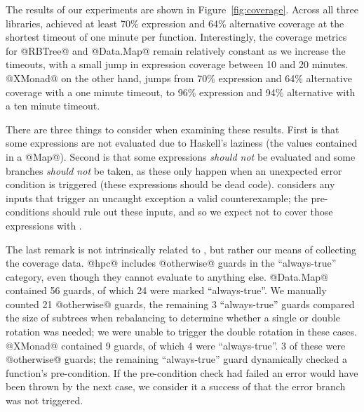 %
The results of our experiments are shown in Figure~\ref{fig:coverage}. 
Across all three libraries, \toolname achieved at least 70\% expression 
and 64\% alternative coverage at the shortest timeout of one minute per function. 
Interestingly, the coverage metrics for @RBTree@ and @Data.Map@ remain relatively constant as we increase
the timeouts, with a small jump in expression coverage between 10 and 20 minutes.
@XMonad@ on the other hand, jumps from 70\% expression and 64\% alternative
coverage with a one minute timeout, to 96\% expression and 94\% alternative
with a ten minute timeout.


There are three things to consider when examining these results. 
%
First is that some expressions are not evaluated due to Haskell's 
laziness (\eg the values contained in a @Map@). 
%
Second is that some expressions \emph{should not} be evaluated 
and some branches \emph{should not} be taken, as these only happen
when an unexpected error condition is triggered (\ie these expressions
should be dead code).
%
\toolname considers any inputs that trigger an uncaught exception a 
valid counterexample; the pre-conditions should rule out these inputs, 
and so we expect not to cover those expressions with \toolname.

The last remark is not intrinsically related to \toolname, 
but rather our means of collecting the coverage data. @hpc@ includes 
@otherwise@ guards in the ``always-true'' category, even though they 
cannot evaluate to anything else. 
%
@Data.Map@ contained 56 guards, of which 24 were marked ``always-true''. We
manually counted 21 \hbox{@otherwise@} guards, the remaining 3 ``always-true''
guards compared the size of subtrees when rebalancing to determine whether a
single or double rotation was needed; we were unable to trigger the double
rotation in these cases.
%
\hbox{@XMonad@} contained 9 guards, of which 4 were ``always-true''. 3 of these
were @otherwise@ guards; the remaining ``always-true'' guard dynamically checked
a function's pre-condition. If the pre-condition check had failed an error would
have been thrown by the next case, we consider it a success of \toolname that
the error branch was not triggered.


